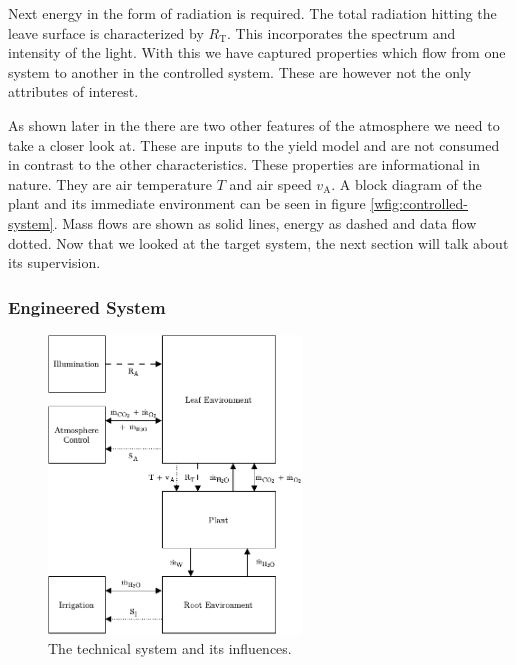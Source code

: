 Next energy in the form of radiation is required.
The total radiation hitting the leave surface is characterized by $R_\text{T}$.
This incorporates the spectrum and intensity of the light.
With this we have captured properties which flow from one system to another in the controlled system.
These are however not the only attributes of interest.

As shown later in the  there are two other features of the atmosphere we need to take a closer look at.
These are inputs to the yield model and are not consumed in contrast to the other characteristics.
These properties are informational in nature.
They are air temperature $T$ and air speed $v_\text{A}$.
A block diagram of the plant and its immediate environment can be seen in figure \ref{wfig:controlled-system}.
Mass flows are shown as solid lines, energy as dashed and data flow dotted.
Now that we looked at the target system, the next section will talk about its supervision.

\paragraph{}
\vspace*{-\parskip}

\subsubsection{Engineered System}
\begin{figure}
	\caption{The technical system and its influences.}
	\label{wfig:engineered-system}
	\includegraphics[width=0.6\textwidth]{img/engineered-system.pdf}
\end{figure} 

